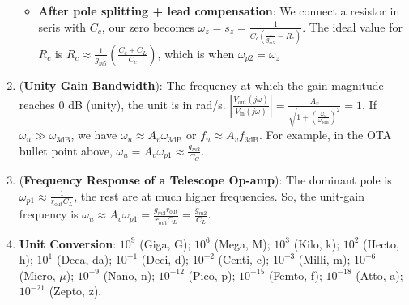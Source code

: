 \documentclass[10pt, landscape]{article}
\begin{document}
\begin{multicols}{4}
\begin{enumerate}
\begin{itemize}
        \item \textbf{After pole splitting + lead compensation}: We connect a resistor in seris with $C_c$, our zero becomes $\omega_z=s_z=\frac{1}{C_c\left(\frac{1}{g_{m5}}-R_c\right)}$. The ideal value for $R_c$ is $R_c\approx\frac{1}{g_{m5}}\left(\frac{C_c+C_L}{C_c}\right)$, which is when $\omega_{p2}=\omega_z$
    \end{itemize}
    \item (\textbf{Unity Gain Bandwidth}): The frequency at which the gain magnitude reaches 0 dB (unity), the unit is in rad/s. $\left|\frac{V_{\text{out}}(j\omega)}{V_{\text{in}}(j\omega)}\right|=\frac{A_v}{\sqrt{1+\left(\frac{\omega_u}{\omega_{3\text{dB}}}\right)^2}}=1$. If $\omega_u\gg\omega_{3\text{dB}}$, we have $\omega_u\approx A_v\omega_{3\text{dB}}\text{ or }f_u\approx A_vf_{3\text{dB}}$. For example, in the OTA bullet point above, $\omega_u=A_v\omega_{p1}\approx\frac{g_{m2}}{C_C}$.
    \item (\textbf{Frequency Response of a Telescope Op-amp}): The dominant pole is $\omega_{p1}\approx\frac{1}{r_{\text{out}}C_L}$, the rest are at much higher frequencies. So, the unit-gain frequency is $\omega_u\approx A_v\omega_{p1} =\frac{g_{m2}r_{\text{out}}}{r_{\text{out}}C_L}=\frac{g_{m2}}{C_L}$.
    \item \textbf{Unit Conversion}: 
    $10^{9}$ (Giga, G);
    $10^{6}$ (Mega, M);
    $10^{3}$ (Kilo, k);
    $10^{2}$ (Hecto, h);
    $10^{1}$ (Deca, da);
    $10^{-1}$ (Deci, d);
    $10^{-2}$ (Centi, c);
    $10^{-3}$ (Milli, m);
    $10^{-6}$ (Micro, $\mu$);
    $10^{-9}$ (Nano, n);
    $10^{-12}$ (Pico, p);
    $10^{-15}$ (Femto, f);
    $10^{-18}$ (Atto, a);
    $10^{-21}$ (Zepto, z).
\end{enumerate}

\end{multicols}

\end{document}
